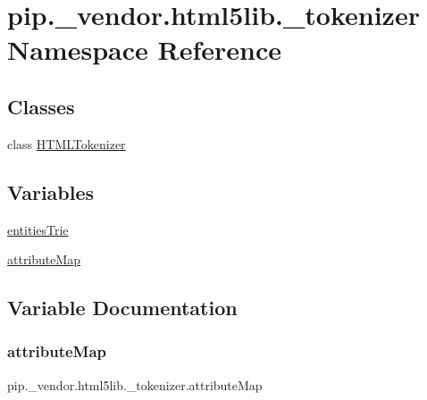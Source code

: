 \hypertarget{namespacepip_1_1__vendor_1_1html5lib_1_1__tokenizer}{}\section{pip.\+\_\+vendor.\+html5lib.\+\_\+tokenizer Namespace Reference}
\label{namespacepip_1_1__vendor_1_1html5lib_1_1__tokenizer}
\subsection*{Classes}
\begin{DoxyCompactItemize}
\item 
class \hyperlink{classpip_1_1__vendor_1_1html5lib_1_1__tokenizer_1_1HTMLTokenizer}{H\+T\+M\+L\+Tokenizer}
\end{DoxyCompactItemize}
\subsection*{Variables}
\begin{DoxyCompactItemize}
\item 
\hyperlink{namespacepip_1_1__vendor_1_1html5lib_1_1__tokenizer_abc7211c3d03924a93a71017a7e277df2}{entities\+Trie}
\item 
\hyperlink{namespacepip_1_1__vendor_1_1html5lib_1_1__tokenizer_a347a5ac79380867b40abc939723c888e}{attribute\+Map}
\end{DoxyCompactItemize}


\subsection{Variable Documentation}
\mbox{\label{namespacepip_1_1__vendor_1_1html5lib_1_1__tokenizer_a347a5ac79380867b40abc939723c888e}} 
\subsubsection{\texorpdfstring{attribute\+Map}{attributeMap}}
{\footnotesize\ttfamily pip.\+\_\+vendor.\+html5lib.\+\_\+tokenizer.\+attribute\+Map}

